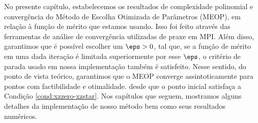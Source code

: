 No presente capítulo, estabelecemos os resultados de complexidade polinomial e convergência  do Método de Escolha Otimizada de Parâmetros (MEOP), em relação à função de mérito que estamos usando. Isso foi feito através das ferramentas de análise de convergência  utilizadas de praxe em \acl{MPI}. Além disso, garantimos que é possível escolher um $\eps>0$, tal que, se a função de mérito em uma dada iteração é limitada superiormente por esse $\eps$, o critério de parada  usado em nossa implementação também é satisfeito. Nesse sentido, do ponto de vista teórico,  garantimos que o  MEOP converge assintoticamente para pontos com factibilidade e otimalidade. desde que o ponto inicial satisfaça a Condição \ref{cond:xzzero-xzstar}. Nos capítulos que seguem, mostramos alguns detalhes da implementação de nosso método bem como seus resultados numéricos.


